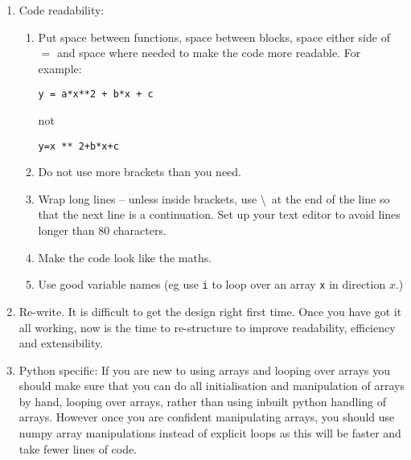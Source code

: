 \begin{enumerate}
\item Code readability:
    \begin{enumerate}
    \item Put space between functions, space between blocks, space either side of $=$ and space where needed to make the code more readable. For example:\\
    \begin{minipage}[t]{0.35\linewidth}\centerline{
        \tt y = a*x**2 + b*x + c
    }\end{minipage}
    \begin{minipage}[t]{0.25\linewidth}\centerline{
        not
    }\end{minipage}
    \begin{minipage}[t]{0.35\linewidth}\centerline{
        \tt y=x ** 2+b*x+c
    }\end{minipage}
    
    \item Do not use more brackets than you need.

    \item Wrap long lines -- unless inside brackets, use \textbackslash\ at the end of the line so that the next line is a continuation. Set up your text editor to avoid lines longer than 80 characters.
    
    \item Make the code look like the maths.
    
    \item Use good variable names (eg use {\tt i} to loop over an array {\tt x} in direction $x$.)

    \end{enumerate}
    
    \item Re-write. It is difficult to get the design right first time. Once you have got it all working, now is the time to re-structure to improve readability, efficiency and extensibility. 
    
    \item Python specific: If you are new to using arrays and looping over arrays you should make sure that you can do all initialisation and manipulation of arrays by hand, looping over arrays, rather than using inbuilt python handling of arrays. However once you are confident manipulating arrays, you should use numpy array manipulations instead of explicit loops as this will be faster and take fewer lines of code.
\end{enumerate}


